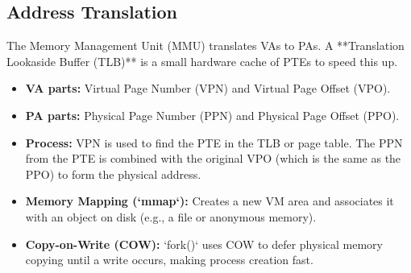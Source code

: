 \documentclass[10pt, twocolumn]{article}
\begin{document}
\subsection*{Address Translation}
The Memory Management Unit (MMU) translates VAs to PAs. A **Translation Lookaside Buffer (TLB)** is a small hardware cache of PTEs to speed this up.
\begin{itemize}
    \item \textbf{VA parts:} Virtual Page Number (VPN) and Virtual Page Offset (VPO).
    \item \textbf{PA parts:} Physical Page Number (PPN) and Physical Page Offset (PPO).
    \item \textbf{Process:} VPN is used to find the PTE in the TLB or page table. The PPN from the PTE is combined with the original VPO (which is the same as the PPO) to form the physical address.
\end{itemize}
\begin{center}
\end{center}
\begin{itemize}
    \item \textbf{Memory Mapping (`mmap`):} Creates a new VM area and associates it with an object on disk (e.g., a file or anonymous memory).
    \item \textbf{Copy-on-Write (COW):} `fork()` uses COW to defer physical memory copying until a write occurs, making process creation fast.
\end{itemize}
\end{document}
